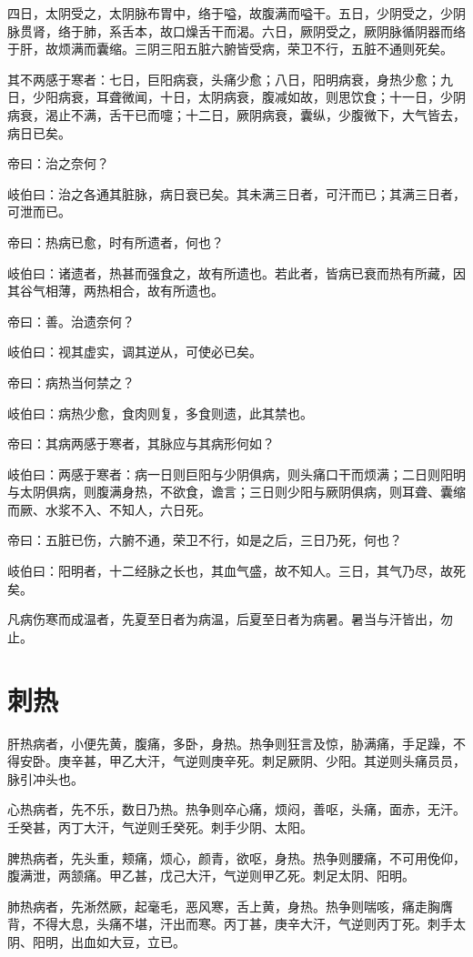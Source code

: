 \documentclass{article}%
\begin{document}
四日，太阴受之，太阴脉布胃中，络于嗌，故腹满而嗌干。五日，少阴受之，少阴脉贯肾，络于肺，系舌本，故口燥舌干而渴。六日，厥阴受之，厥阴脉循阴器而络于肝，故烦满而囊缩。三阴三阳五脏六腑皆受病，荣卫不行，五脏不通则死矣。

其不两感于寒者：七日，巨阳病衰，头痛少愈；八日，阳明病衰，身热少愈；九日，少阳病衰，耳聋微闻，十日，太阴病衰，腹减如故，则思饮食；十一日，少阴病衰，渴止不满，舌干已而嚏；十二日，厥阴病衰，囊纵，少腹微下，大气皆去，病日已矣。

帝曰：治之奈何？

岐伯曰：治之各通其脏脉，病日衰已矣。其未满三日者，可汗而已；其满三日者，可泄而已。

帝曰：热病已愈，时有所遗者，何也？

岐伯曰：诸遗者，热甚而强食之，故有所遗也。若此者，皆病已衰而热有所藏，因其谷气相薄，两热相合，故有所遗也。

帝曰：善。治遗奈何？

岐伯曰：视其虚实，调其逆从，可使必已矣。

帝曰：病热当何禁之？

岐伯曰：病热少愈，食肉则复，多食则遗，此其禁也。

帝曰：其病两感于寒者，其脉应与其病形何如？

岐伯曰：两感于寒者：病一日则巨阳与少阴俱病，则头痛口干而烦满；二日则阳明与太阴俱病，则腹满身热，不欲食，谵言；三日则少阳与厥阴俱病，则耳聋、囊缩而厥、水浆不入、不知人，六日死。

帝曰：五脏已伤，六腑不通，荣卫不行，如是之后，三日乃死，何也？

岐伯曰：阳明者，十二经脉之长也，其血气盛，故不知人。三日，其气乃尽，故死矣。

凡病伤寒而成温者，先夏至日者为病温，后夏至日者为病暑。暑当与汗皆出，勿止。


\section{刺热}
肝热病者，小便先黄，腹痛，多卧，身热。热争则狂言及惊，胁满痛，手足躁，不得安卧。庚辛甚，甲乙大汗，气逆则庚辛死。刺足厥阴、少阳。其逆则头痛员员，脉引冲头也。

心热病者，先不乐，数日乃热。热争则卒心痛，烦闷，善呕，头痛，面赤，无汗。壬癸甚，丙丁大汗，气逆则壬癸死。刺手少阴、太阳。

脾热病者，先头重，颊痛，烦心，颜青，欲呕，身热。热争则腰痛，不可用俛仰，腹满泄，两颔痛。甲乙甚，戊己大汗，气逆则甲乙死。刺足太阴、阳明。

肺热病者，先淅然厥，起毫毛，恶风寒，舌上黄，身热。热争则喘咳，痛走胸膺背，不得大息，头痛不堪，汗出而寒。丙丁甚，庚辛大汗，气逆则丙丁死。刺手太阴、阳明，出血如大豆，立已。
\end{document}
